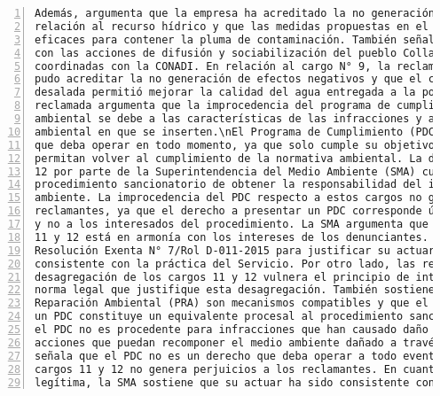 \begin{Verbatim}[frame=lines, label=Elavoración propia -  Ejemplo de Contexto enviado por el Chatbot a OpenAI
				, fontsize=\scriptsize, numbers=left
				, baselinestretch=0.4
				, formatcom=\color{gray}]
Además, argumenta que la empresa ha acreditado la no generación de efectos negativos en
relación al recurso hídrico y que las medidas propuestas en el programa de cumplimiento son
eficaces para contener la pluma de contaminación. También señala que la empresa ha cumplido
con las acciones de difusión y sociabilización del pueblo Colla, pese a no haber sido
coordinadas con la CONADI. En relación al cargo N° 9, la reclamada sostiene que la empresa
pudo acreditar la no generación de efectos negativos y que el caudal entregado de agua
desalada permitió mejorar la calidad del agua entregada a la población. Por último, la
reclamada argumenta que la improcedencia del programa de cumplimiento en casos de daño
ambiental se debe a las características de las infracciones y al contexto regulatorio
ambiental en que se inserten.\nEl Programa de Cumplimiento (PDC) no es un derecho del titular
que deba operar en todo momento, ya que solo cumple su objetivo a través de medidas que
permitan volver al cumplimiento de la normativa ambiental. La desagregación de los cargos 11 y
12 por parte de la Superintendencia del Medio Ambiente (SMA) cumple con la finalidad del
procedimiento sancionatorio de obtener la responsabilidad del infractor y proteger el medio
ambiente. La improcedencia del PDC respecto a estos cargos no genera perjuicios a los
reclamantes, ya que el derecho a presentar un PDC corresponde únicamente al presunto infractor
y no a los interesados del procedimiento. La SMA argumenta que la desagregación de los cargos
11 y 12 está en armonía con los intereses de los denunciantes. Además, la SMA se refiere a la
Resolución Exenta N° 7/Rol D-011-2015 para justificar su actuar y sostiene que ha sido
consistente con la práctica del Servicio. Por otro lado, las reclamantes argumentan que la
desagregación de los cargos 11 y 12 vulnera el principio de integridad y que no existe una
norma legal que justifique esta desagregación. También sostienen que el PDC y los Planes de
Reparación Ambiental (PRA) son mecanismos compatibles y que el cumplimiento satisfactorio de
un PDC constituye un equivalente procesal al procedimiento sancionatorio. La SMA argumenta que
el PDC no es procedente para infracciones que han causado daño ambiental, ya que no existen
acciones que puedan recomponer el medio ambiente dañado a través de este instrumento. Además,
señala que el PDC no es un derecho que deba operar a todo evento y que la desagregación de los
cargos 11 y 12 no genera perjuicios a los reclamantes. En cuanto al principio de confianza
legítima, la SMA sostiene que su actuar ha sido consistente con sus propios precedentes. En

\end{Verbatim}
